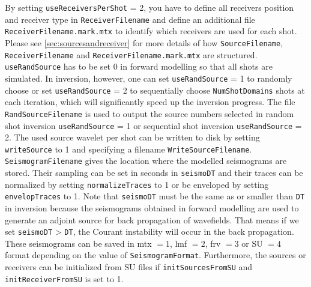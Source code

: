 \documentclass[pdftex,a4paper,parskip,listof=totoc,bibliography=totoc,onehalfspacing,12pt]{scrreprt}
\begin{document}
By setting \verb+useReceiversPerShot+ = 2, you have to define all receivers position and receiver type in \verb+ReceiverFilename+ and define an additional file \verb+ReceiverFilename.mark.mtx+ to identify which receivers are used for each shot. Please see \ref{sec:sourcesandreceiver} for more details of how  \verb+SourceFilename+, \verb+ReceiverFilename+ and \verb+ReceiverFilename.mark.mtx+ are structured.  \verb+useRandSource+ has to be set 0 in forward modelling so that all shots are simulated. In inversion, however, one can set \verb+useRandSource+ = 1 to randomly choose or set \verb+useRandSource+ = 2 to sequentially choose \verb+NumShotDomains+ shots at each iteration, which will significantly speed up the inversion progress. The file \verb+RandSourceFilename+ is used to output the source numbers selected in random shot inversion \verb+useRandSource+ = 1 or sequential shot inversion \verb+useRandSource+ = 2.
The used source wavelet per shot can be written to disk by setting \verb+writeSource+ to 1 and specifying a filename \verb+WriteSourceFilename+.
\verb+SeismogramFilename+ gives the location where the modelled seismograms are stored. Their sampling can be set in seconds in \verb+seismoDT+ and their traces can be normalized by setting \verb+normalizeTraces+ to 1 or be enveloped by setting \verb+envelopTraces+ to 1. Note that \verb+seismoDT+ must be the same as or smaller than \verb+DT+ in inversion because the seismograms obtained in forward modelling are used to generate an adjoint source for back propagation of wavefields. That means if we set \verb+seismoDT+ > \verb+DT+, the Courant instability will occur in the back propagation.
These seismograms can be saved in mtx $=1$, lmf $=2$, frv $=3$ or SU $=4$ format depending on the value of \verb+SeismogramFormat+.  
Furthermore, the sources or receivers can be initialized from SU files if \verb+initSourcesFromSU+ and \verb+initReceiverFromSU+ is set to 1.
\end{document}
